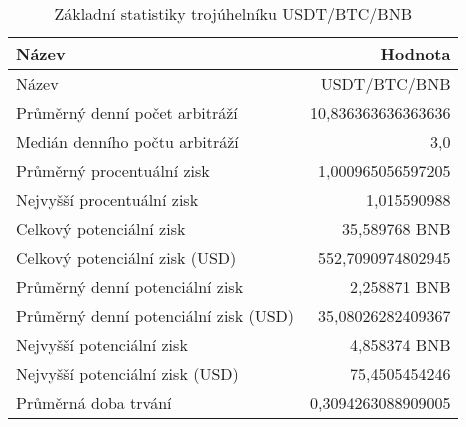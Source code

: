 \begin{table}\centering
\caption{Základní statistiky trojúhelníku USDT/BTC/BNB}
\label{USDTBTCBNB_stats}
\begin{tabular}{|| l | r ||}
\hline Název & Hodnota \\ 
\hline\hline Název & USDT/BTC/BNB \\ 
\hline Průměrný denní počet arbitráží & 10,836363636363636 \\ 
\hline Medián denního počtu arbitráží & 3,0 \\ 
\hline Průměrný procentuální zisk & 1,000965056597205 \\ 
\hline Nejvyšší procentuální zisk & 1,015590988 \\ 
\hline Celkový potenciální zisk & 35,589768 BNB \\ 
\hline Celkový potenciální zisk (USD) & 552,7090974802945 \\ 
\hline Průměrný denní potenciální zisk & 2,258871 BNB \\ 
\hline Průměrný denní potenciální zisk (USD) & 35,08026282409367 \\ 
\hline Nejvyšší potenciální zisk & 4,858374 BNB \\ 
\hline Nejvyšší potenciální zisk (USD) & 75,4505454246 \\ 
\hline Průměrná doba trvání & 0,3094263088909005 \\ 
\hline
\end{tabular}
\end{table}